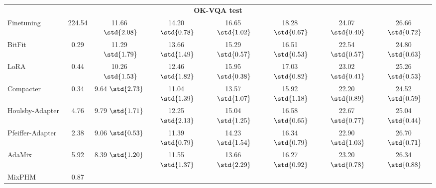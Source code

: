 \begin{table}[!t]
{\begin{tabularx}{\linewidth}{lccccccc}
\midrule
\multicolumn{8}{c}{\textbf{OK-VQA test}}
\\

\rowcolor{gray!40}%
Finetuning &224.54 
&11.66$~\std{2.08}$
&14.20$~\std{0.78}$
&16.65$~\std{1.02}$
&18.28$~\std{0.67}$
&24.07$~\std{0.40}$
&26.66$~\std{0.72}$
\\ 

BitFit~\cite{zaken2022bitfit} 
&0.29
&11.29$~\std{1.79}$ %
&13.66$~\std{1.49}$
&15.29$~\std{0.57}$
&16.51$~\std{0.53}$
&22.54$~\std{0.57}$
&24.80$~\std{0.63}$
\\

% 
LoRA~\cite{hu2022lora}
&0.44
&10.26$~\std{1.53}$
&12.46$~\std{1.82}$
&15.95$~\std{0.38}$
&17.03$~\std{0.82}$
&23.02$~\std{0.41}$
&25.26$~\std{0.53}$
\\ 

Compacter~\cite{karimi2021compacter}  &0.34 
&9.64$~\std{2.73}$ %
&11.04$~\std{1.39}$
&13.57$~\std{1.07}$
&15.92$~\std{1.18}$
&22.20$~\std{0.89}$
&24.52$~\std{0.59}$
\\ 


Houlsby-Adapter ~\cite{houlsby2019parameter}
&4.76 
&9.79$~\std{1.71}$
&12.25$~\std{2.13}$
&15.04$~\std{1.25}$
&16.58$~\std{0.65}$
&22.67$~\std{0.77}$
&25.04$~\std{0.44}$
\\ 

Pfeiffer-Adapter~\cite{pfeiffer2020adapterfusion} 
&2.38
&9.06$~\std{0.53}$
&11.39$~\std{0.79}$
&14.23$~\std{1.54}$
&16.34$~\std{0.79}$
&22.90$~\std{1.03}$
&26.70$~\std{0.71}$
\\ 

AdaMix~\cite{wang2022adamix}
&5.92 
&8.39$~\std{1.20}$
&11.55$~\std{1.37}$
&13.66$~\std{2.29}$
&16.27$~\std{0.92}$
&23.20$~\std{0.78}$
&26.34$~\std{0.88}$
\\ 

MixPHM
&0.87
&\textbf{\color{blue}{13.87$~\std{2.39}$}} 
&\textbf{\color{blue}{16.03$~\std{1.23}$}}
&\textbf{\color{blue}{18.58$~\std{1.42}$}} 
&\textbf{\color{blue}{20.16$~\std{0.97}$}}
&\textbf{\color{blue}{26.08$~\std{0.88}$}} 
&\textbf{\color{blue}{28.53$~\std{0.85}$}} 
\\ 

\bottomrule
\end{tabularx}
}
\end{table}

